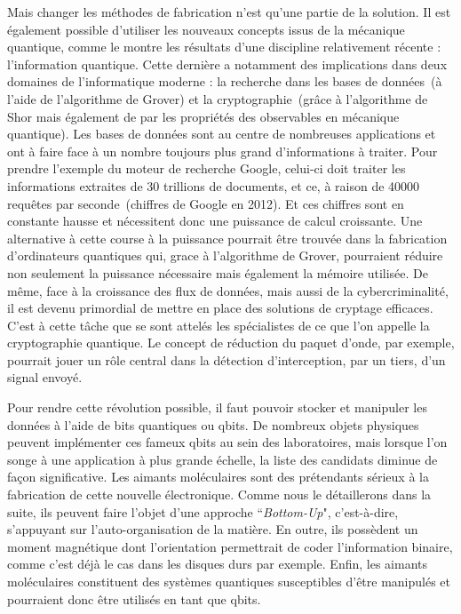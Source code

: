 Mais changer les méthodes de fabrication n'est qu'une partie de la solution. Il est également possible d'utiliser les nouveaux concepts issus de la mécanique quantique, comme le montre les résultats d'une discipline relativement récente : l'information quantique. Cette dernière a notamment des implications dans deux domaines de l'informatique moderne : la recherche dans les bases de données~(à l'aide de l’algorithme de Grover) et la cryptographie~(grâce à l'algorithme de Shor mais également de par les propriétés des observables en mécanique quantique). Les bases de données sont au centre de nombreuses applications et ont à faire face à un nombre toujours plus grand d'informations à traiter. Pour prendre l'exemple du moteur de recherche Google, celui-ci doit traiter les informations extraites de 30 trillions de documents, et ce, à raison de 40000 requêtes par seconde~(chiffres de Google en 2012). Et ces chiffres sont en constante hausse et nécessitent donc une puissance de calcul croissante. Une alternative à cette course à la puissance pourrait être trouvée dans la fabrication d'ordinateurs quantiques qui, grace à l'algorithme de Grover, pourraient réduire non seulement la puissance nécessaire mais également la mémoire utilisée. De m\^eme, face à la croissance des flux de données, mais aussi de la cybercriminalité, il est devenu primordial de mettre en place des solutions de cryptage efficaces. C'est à cette t\^ache que se sont attelés les spécialistes de ce que l’on appelle la cryptographie quantique. Le concept de réduction du paquet d'onde, par exemple, pourrait jouer un rôle central dans la détection d'interception, par un tiers, d'un signal envoyé.

Pour rendre cette révolution possible, il faut pouvoir stocker et manipuler les données à l'aide de bits quantiques ou qbits. De nombreux objets physiques peuvent implémenter ces fameux qbits au sein des laboratoires, mais lorsque l'on songe à une application à plus grande échelle, la liste des candidats diminue de façon significative. Les aimants moléculaires sont des prétendants sérieux à la fabrication de cette nouvelle électronique. Comme nous le détaillerons dans la suite, ils peuvent faire l'objet d'une approche ``\textit{Bottom-Up}", c'est-à-dire, s'appuyant sur l'auto-organisation de la matière. En outre, ils possèdent un moment magnétique dont l'orientation permettrait de coder l'information binaire, comme c'est déjà le cas dans les disques durs par exemple. Enfin, les aimants moléculaires constituent des systèmes quantiques susceptibles d'\^etre manipulés et pourraient donc \^etre utilisés en tant que qbits.

